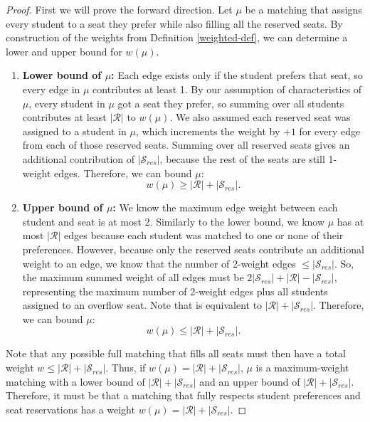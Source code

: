 \begin{proof}
  First we will prove the forward direction. Let $\mu$ be a matching that
  assigns every student to a seat they
  prefer while also filling all the reserved seats. By construction of the weights from Definition
  \ref{weighted-def}, we can determine a lower and upper bound for $w(\mu)$. 

  \begin{enumerate}
    \item
          \textbf{Lower bound of $\mu$:} Each edge exists only
          if the student prefers that seat, so every edge in $\mu$ contributes at
          least 1. By our assumption of characteristics of $\mu$, every student in
          $\mu$ got a seat they prefer, so summing over all students contributes at
          least $|\mathcal{R}|$ to $w(\mu)$. We also assumed each reserved seat was assigned to
          a student in $\mu$, which increments the weight by $+1$ for every
          edge from each of those reserved seats. Summing over all reserved seats gives an
          additional contribution of $|\mathcal{S}_{res}|$, because the rest of the seats are still
          1-weight edges. Therefore, we can bound $\mu$: \[ w(\mu) \geq
            |\mathcal{R}| +
            |\mathcal{S}_{res}|.
          \]

    \item
      \textbf{Upper bound of $\mu$:} We know the maximum edge
          weight between each student and seat is at most 2. Similarly to the
          lower bound, we know $\mu$ has at most $|\mathcal{R}|$
          edges because each student was matched to one or none of their preferences.
          However, because only the reserved seats contribute an additional weight
          to an edge, we know that the number of 2-weight edges $\leq
          |\mathcal{S}_{res}|$. So,
          the maximum summed weight of all edges must be $2|\mathcal{S}_{res}| +
          |\mathcal{R}| -
          |\mathcal{S}_{res}|$,
          representing the maximum number of 2-weight edges plus all students
          assigned to an overflow seat. Note that is equivalent to $|\mathcal{R}| +
          |\mathcal{S}_{res}|$. 
          Therefore, we can bound $\mu$: \[ w(\mu) \leq |\mathcal{R}| +
          |\mathcal{S}_{res}|. \]
  \end{enumerate}

  Note that any possible full matching that fills all seats must then have a total weight $w \leq |\mathcal{R}| +
  |\mathcal{S}_{res}|$. Thus, if $w(\mu) = |\mathcal{R}| +
  |\mathcal{S}_{res}|$, $\mu$ is a maximum-weight matching with a lower bound of $|\mathcal{R}| +
  |\mathcal{S}_{res}|$ and an upper bound of $|\mathcal{R}| +
  |\mathcal{S}_{res}|$. Therefore, it must be that a matching that fully
  respects student preferences and seat reservations has a weight $w(\mu) =
  |\mathcal{R}| + |\mathcal{S}_{res}|$.


\end{proof}
